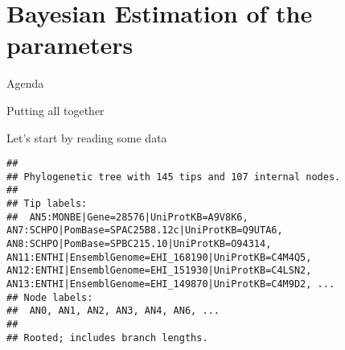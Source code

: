 \documentclass[9pt,handout,ignorenonframetext,]{beamer}
\newenvironment{Shaded}{\begin{snugshade}}{\end{snugshade}}
\newcommand{\KeywordTok}[1]{\textcolor[rgb]{0.94,0.87,0.69}{#1}}
\newcommand{\DataTypeTok}[1]{\textcolor[rgb]{0.87,0.87,0.75}{#1}}
\newcommand{\StringTok}[1]{\textcolor[rgb]{0.80,0.58,0.58}{#1}}
\newcommand{\CommentTok}[1]{\textcolor[rgb]{0.50,0.62,0.50}{#1}}
\newcommand{\OperatorTok}[1]{\textcolor[rgb]{0.94,0.94,0.82}{#1}}
\newcommand{\NormalTok}[1]{\textcolor[rgb]{0.80,0.80,0.80}{#1}}
\begin{document}
\section{Bayesian Estimation of the
parameters}\label{bayesian-estimation-of-the-parameters}

\begin{frame}[t]{Agenda}

\tableofcontents[currentsection]

\end{frame}

\begin{frame}[fragile]{Putting all together}

Let's start by reading some data

\footnotesize

\begin{Shaded}
\end{Shaded}

\begin{verbatim}
## 
## Phylogenetic tree with 145 tips and 107 internal nodes.
## 
## Tip labels:
##  AN5:MONBE|Gene=28576|UniProtKB=A9V8K6, AN7:SCHPO|PomBase=SPAC25B8.12c|UniProtKB=Q9UTA6, AN8:SCHPO|PomBase=SPBC215.10|UniProtKB=O94314, AN11:ENTHI|EnsemblGenome=EHI_168190|UniProtKB=C4M4Q5, AN12:ENTHI|EnsemblGenome=EHI_151930|UniProtKB=C4LSN2, AN13:ENTHI|EnsemblGenome=EHI_149870|UniProtKB=C4M9D2, ...
## Node labels:
##  AN0, AN1, AN2, AN3, AN4, AN6, ...
## 
## Rooted; includes branch lengths.
\end{verbatim}

\normalsize

\end{frame}
\end{document}

